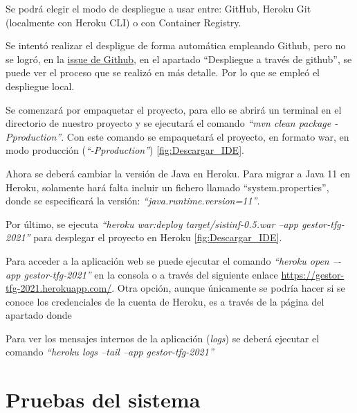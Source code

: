 
Se podrá elegir el modo de despliegue a usar entre: GitHub, Heroku Git (localmente con Heroku CLI) o con Container Registry.


Se intentó realizar el despligue de forma automática empleando Github, pero no se logró, en la \href{https://github.com/dbo1001/Gestor-TFG-2021/issues/112}{issue de Github}, en el apartado ``Despliegue a través de github'', se puede ver el proceso que se realizó en más detalle. Por lo que se empleó el despliegue local. 

Se comenzará por empaquetar el proyecto, para ello se abrirá un terminal en el directorio de nuestro proyecto y se ejecutará el comando \emph{``mvn clean package -Pproduction''}. Con este comando se empaquetará el proyecto, en formato war, en modo producción (\emph{``-Pproduction''}) \ref{fig:Descargar_IDE}.


Ahora se deberá cambiar la versión de Java en Heroku. Para migrar a Java 11 en Heroku, solamente hará falta incluir un fichero llamado ``system.properties'', donde se especificará la versión: \emph{``java.runtime.version=11''}.

Por último, se ejecuta \emph{``heroku war:deploy target/sistinf-0.5.war --app gestor-tfg-2021''} para desplegar el proyecto en Heroku \ref{fig:Descargar_IDE}. 


Para acceder a la aplicación web se puede ejecutar el comando \emph{“heroku open –-app gestor-tfg-2021”} en la consola o a través del siguiente enlace \href{https://gestor-tfg-2021.herokuapp.com/}{https://gestor-tfg-2021.herokuapp.com/}. Otra opción, aunque únicamente se podría hacer si se conoce los credenciales de la cuenta de Heroku, es a través de la página del apartado donde 

Para ver los mensajes internos de la aplicación (\emph{logs}) se deberá ejecutar el comando \emph{``heroku logs --tail --app gestor-tfg-2021''}

\section{Pruebas del sistema}

